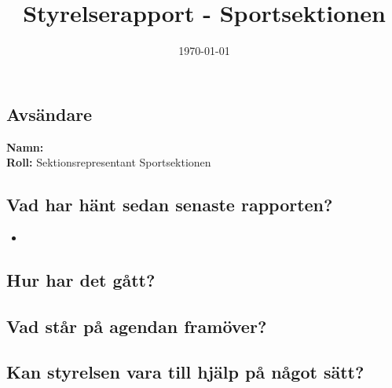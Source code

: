 \documentclass[a4paper]{article}
\begin{document}
	\title{Styrelserapport - Sportsektionen}
	\date{\today}
	\maketitle

	\subsection{Avsändare}
		\textbf{Namn:}\\
		\textbf{Roll:} Sektionsrepresentant Sportsektionen\\
	\subsection{Vad har hänt sedan senaste rapporten?}
	\begin{itemize}
		\item
	\end{itemize}
	\subsection{Hur har det gått?}
	\subsection{Vad står på agendan framöver?}
	\subsection{Kan styrelsen vara till hjälp på något sätt?}
\end{document}
